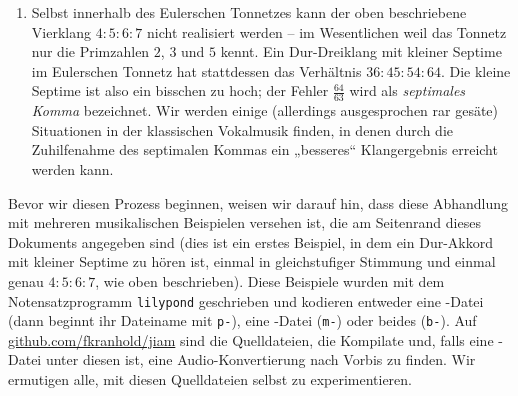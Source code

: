 \begin{enumerate}
\item Selbst innerhalb des Eulerschen Tonnetzes kann der oben beschriebene
  Vierklang $4:5:6:7$ nicht realisiert werden – im Wesentlichen weil das Tonnetz
  nur die Primzahlen $2$, $3$ und $5$ kennt. Ein Dur-Dreiklang mit kleiner
  Septime im Eulerschen Tonnetz hat stattdessen das Verhältnis $36:45:54:64$.
  Die kleine Septime ist also ein bisschen zu hoch; der Fehler $\frac{64}{63}$
  wird als \emph{septimales Komma} bezeichnet. Wir werden einige (allerdings
  ausgesprochen rar gesäte) Situationen in der klassischen Vokalmusik finden,
  in denen durch die Zuhilfenahme des septimalen Kommas ein „besseres“
  Klangergebnis erreicht werden kann.
\end{enumerate}


Bevor wir diesen Prozess beginnen, weisen wir darauf hin, dass diese Abhandlung
mit mehreren musikalischen Beispielen versehen ist, die am Seitenrand dieses
Dokuments angegeben sind (dies ist ein erstes Beispiel, in dem ein
Dur-Akkord mit kleiner Septime zu hören ist, einmal in gleichstufiger Stimmung
und einmal genau $4:5:6:7$, wie oben beschrieben). Diese Beispiele wurden mit
dem Notensatzprogramm \verb!lilypond! geschrieben und kodieren entweder eine
-Datei (dann beginnt ihr Dateiname mit \verb!p-!), eine
-Datei (\verb!m-!) oder beides (\verb!b-!). Auf
\href{https://github.com/fkranhold/jiam/}{\textsf{github.com/fkranhold/jiam}}
sind die Quelldateien, die Kompilate und, falls eine -Datei unter
diesen ist, eine Audio-Konvertierung nach  Vorbis zu finden. Wir
ermutigen alle, mit diesen Quelldateien selbst zu experimentieren.

